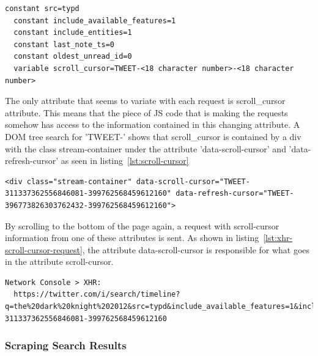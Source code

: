   \begin{lstlisting}[caption={Variables and constants of the XHR requests sent when scrolling to the bottom of the Twitter search result page.},label={lst:scrolling-xhr-variables},captionpos=b]
  constant src=typd
  constant include_available_features=1
  constant include_entities=1
  constant last_note_ts=0
  constant oldest_unread_id=0
  variable scroll_cursor=TWEET-<18 character number>-<18 character number>
  \end{lstlisting}

The only attribute that seems to variate with each request is scroll\_cursor attribute. This means that the piece of JS code that is making the requests somehow has access to the information contained in this changing attribute. A DOM tree search for 'TWEET-' shows that scroll\_cursor is contained by a div with the class stream-container under the attribute 'data-scroll-cursor' and 'data-refresh-cursor' as seen in listing~\ref{lst:scroll-cursor}

  \begin{lstlisting}[caption={The div element of the Twitter search result that contains the scroll cursor which is used in the XHR requests made to retrieve more tweets when scrolling to the bottom of the page.},label={lst:scroll-cursor},captionpos=b]
  <div class="stream-container" data-scroll-cursor="TWEET-311337362556846081-399762568459612160" data-refresh-cursor="TWEET-396773826303762432-399762568459612160">
  \end{lstlisting}

By scrolling to the bottom of the page again, a request with scroll-cursor information from one of these attributes is sent.
As shown in listing~\ref{lst:xhr-scroll-cursor-request}, the attribute data-scroll-cursor is responsible for what goes in the attribute scroll-cursor.

  \begin{lstlisting}[caption={XHR request made when scrolling to the bottom of the page showing that the scroll cursor has been extracted from the div element in listing~\ref{lst:scroll-cursor}},label={lst:xhr-scroll-cursor-request},captionpos=b]
  Network Console > XHR:
  https://twitter.com/i/search/timeline?q=the%20dark%20knight%202012&src=typd&include_available_features=1&include_entities=1&last_note_ts=0&scroll_cursor=TWEET-311337362556846081-399762568459612160
  \end{lstlisting}

\subsubsection{Scraping Search Results}

